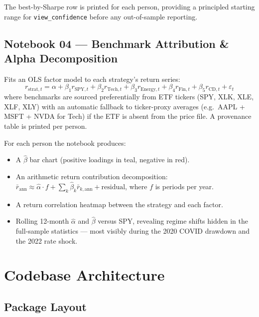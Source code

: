\documentclass[11pt, a4paper]{article}
\newcommand{\code}[1]{\texttt{#1}}
\begin{document}
The best-by-Sharpe row is printed for each person, providing a principled
starting range for \code{view\_confidence} before any out-of-sample reporting.

\subsection{Notebook 04 --- Benchmark Attribution \& Alpha Decomposition}

Fits an OLS factor model to each strategy's return series:
\begin{equation}
  r_{\text{strat},t} = \alpha
    + \beta_1 r_{\text{SPY},t}
    + \beta_2 r_{\text{Tech},t}
    + \beta_3 r_{\text{Energy},t}
    + \beta_4 r_{\text{Fin},t}
    + \beta_5 r_{\text{CD},t}
    + \varepsilon_t
  \label{eq:ols}
\end{equation}
where benchmarks are sourced preferentially from ETF tickers (SPY, XLK, XLE,
XLF, XLY) with an automatic fallback to ticker-proxy averages
(e.g.\ AAPL + MSFT + NVDA for Tech) if the ETF is absent from the price
file. A provenance table is printed per person.

For each person the notebook produces:
\begin{itemize}
  \item A $\hat{\beta}$ bar chart (positive loadings in teal, negative in red).
  \item An arithmetic return contribution decomposition:
        $\bar{r}_{\text{ann}} \approx \hat{\alpha}\cdot f + \sum_k \hat{\beta}_k \bar{r}_{k,\text{ann}} + \text{residual}$,
        where $f$ is periods per year.
  \item A return correlation heatmap between the strategy and each factor.
  \item Rolling 12-month $\hat{\alpha}$ and $\hat{\beta}$ versus SPY, revealing
        regime shifts hidden in the full-sample statistics --- most visibly
        during the 2020 COVID drawdown and the 2022 rate shock.
\end{itemize}

\section{Codebase Architecture}

\subsection{Package Layout}
\end{document}
